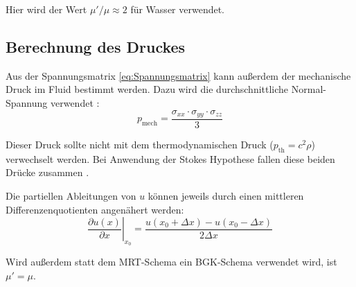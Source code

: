 \documentclass[a4paper,10pt]{scrreprt}
\begin{document}
Hier wird der Wert $\mu' / \mu \approx 2$ für Wasser \cite{Rosenhead1954} verwendet.

\subsection{Berechnung des Druckes}
Aus der Spannungsmatrix \eqref{eq:Spannungsmatrix} kann außerdem der mechanische Druck im Fluid bestimmt werden.
Dazu wird die durchschnittliche Normal-Spannung verwendet \cite{Graves1999}:
\begin{equation}
 p_{\text{mech}} = \frac{\sigma_{xx} \cdot \sigma_{yy} \cdot \sigma_{zz}}{3}
\end{equation}

Dieser Druck sollte nicht mit dem thermodynamischen Druck ($p_{\text{th}}=c^2 \rho$) verwechselt werden. Bei Anwendung der Stokes Hypothese fallen diese beiden Drücke zusammen \cite{Graves1999}.

Die partiellen Ableitungen von $u$ können jeweils durch einen mittleren Differenzenquotienten angenähert werden:
\begin{equation}
 \left. \frac{\partial u(x)}{\partial x}\right|_{x_0} = \frac{u(x_0 + \Delta x) - u(x_0 - \Delta x)}{2 \Delta x}
\end{equation}

Wird außerdem statt dem MRT-Schema ein BGK-Schema verwendet wird, ist $\mu' =  \mu$.






\printbibliography
\end{document}
